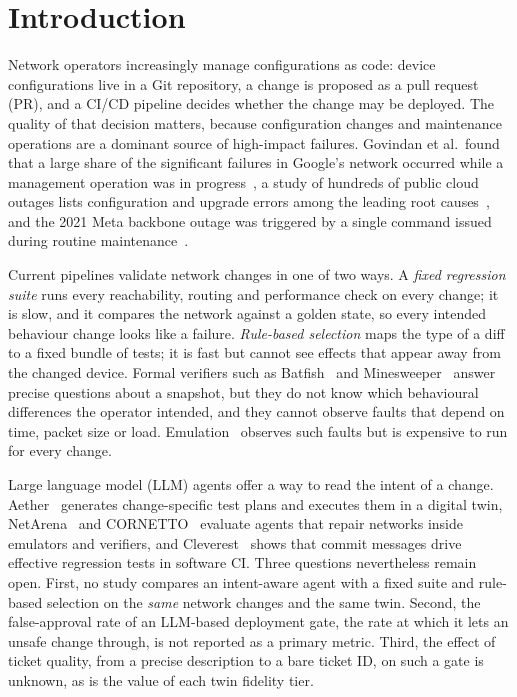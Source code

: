 \documentclass[pdflatex,iicol,sn-mathphys-num]{sn-jnl}%
\theoremstyle{thmstyletwo}%
\begin{document}
\section{Introduction}\label{sec:intro}

Network operators increasingly manage configurations as code: device configurations live in a Git repository, a change is proposed as a pull request (PR), and a CI/CD pipeline decides whether the change may be deployed. The quality of that decision matters, because configuration changes and maintenance operations are a dominant source of high-impact failures. Govindan et al.\ found that a large share of the significant failures in Google's network occurred while a management operation was in progress~\cite{govindan2016evolve}, a study of hundreds of public cloud outages lists configuration and upgrade errors among the leading root causes~\cite{gunawi2016cloud}, and the 2021 Meta backbone outage was triggered by a single command issued during routine maintenance~\cite{meta2021outage}.

Current pipelines validate network changes in one of two ways. A \emph{fixed regression suite} runs every reachability, routing and performance check on every change; it is slow, and it compares the network against a golden state, so every intended behaviour change looks like a failure. \emph{Rule-based selection} maps the type of a diff to a fixed bundle of tests; it is fast but cannot see effects that appear away from the changed device. Formal verifiers such as Batfish~\cite{fogel2015batfish} and Minesweeper~\cite{beckett2017minesweeper} answer precise questions about a snapshot, but they do not know which behavioural differences the operator intended, and they cannot observe faults that depend on time, packet size or load. Emulation~\cite{liu2017crystalnet} observes such faults but is expensive to run for every change.

Large language model (LLM) agents offer a way to read the intent of a change. Aether~\cite{auge2026aether} generates change-specific test plans and executes them in a digital twin, NetArena~\cite{zhou2026netarena} and CORNETTO~\cite{asadli2026cornetto} evaluate agents that repair networks inside emulators and verifiers, and Cleverest~\cite{liu2026cleverest} shows that commit messages drive effective regression tests in software CI. Three questions nevertheless remain open. First, no study compares an intent-aware agent with a fixed suite and rule-based selection on the \emph{same} network changes and the same twin. Second, the false-approval rate of an LLM-based deployment gate, the rate at which it lets an unsafe change through, is not reported as a primary metric. Third, the effect of ticket quality, from a precise description to a bare ticket ID, on such a gate is unknown, as is the value of each twin fidelity tier.
\end{document}
